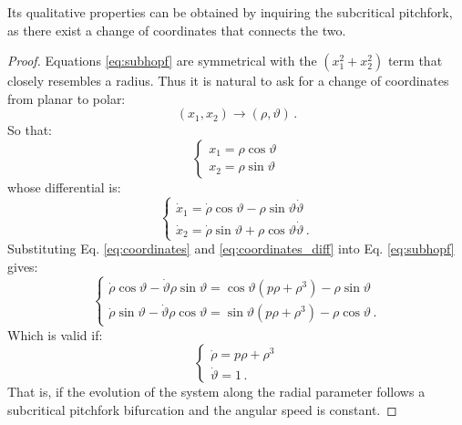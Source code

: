 Its qualitative properties can be obtained by inquiring the subcritical pitchfork, as there exist a change of coordinates that connects the two.
\begin{proof}
	Equations \ref{eq:subhopf} are symmetrical with the $(x_1^2 + x_2^2)$ term that closely resembles a radius. Thus it is natural to ask for a change of coordinates from planar to polar:
	\begin{equation}
		(x_1,x_2) \rightarrow (\rho, \vartheta) \, .
	\end{equation}
	So that:
	\begin{equation}
		\left\{
		\begin{array}{ll}
			x_1 = \rho \cos \vartheta\\
			x_2 = \rho \sin \vartheta
		\end{array}
		\right.
		\label{eq:coordinates}
	\end{equation}
	whose differential is:
	\begin{equation}
		\left\{
		\begin{array}{ll}
			\dot{x}_1 = \dot{\rho} \cos \vartheta - \rho \sin\vartheta \dot{\vartheta}\\
			\dot{x}_2 = \dot{\rho} \sin \vartheta + \rho \cos\vartheta \dot{\vartheta} \, .
		\end{array}
		\right.
		\label{eq:coordinates_diff}
	\end{equation}
	Substituting Eq. \ref{eq:coordinates} and \ref{eq:coordinates_diff} into Eq. \ref{eq:subhopf} gives:
	\begin{equation}
		\left\{
		\begin{array}{ll}
			\dot{\rho} \cos \vartheta - \dot{\vartheta} \rho \sin\vartheta = \cos\vartheta(p\rho + \rho^3) - \rho \sin\vartheta \\
			\dot{\rho} \sin \vartheta - \dot{\vartheta} \rho \cos\vartheta = \sin\vartheta(p\rho + \rho^3) - \rho \cos\vartheta \, . 
		\end{array}
		\right.
	\end{equation}
	Which is valid if:
	\begin{equation}
		\left\{
		\begin{array}{ll}
			\dot{\rho} = p \rho + \rho^3 \\
			\dot{\vartheta} = 1 \, .
		\end{array}
		\right.
	\end{equation}
	That is, if the evolution of the system along the radial parameter follows a subcritical pitchfork bifurcation and the angular speed is constant.
\end{proof}

